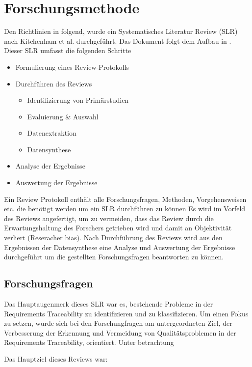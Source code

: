 \section{Forschungsmethode}
Den Richtlinien in \cite{Keele2007GuidelinesEngineering} folgend, wurde ein Systematisches Literatur Review (SLR) nach Kitchenham et al. durchgeführt. Das Dokument folgt dem Aufbau in \cite{Walia2009AErrors}. Dieser SLR umfasst die folgenden Schritte

\begin{itemize}
    \item Formulierung eines Review-Protokolls
    \item Durchführen des Reviews
        \begin{itemize}
            \item Identifizierung von Primärstudien
            \item Evaluierung \& Auswahl
            \item Datenextraktion
            \item Datensynthese
        \end{itemize}
    \item Analyse der Ergebnisse
    \item Auswertung der Ergebnisse
\end{itemize}

Ein Review Protokoll enthält alle Forschungsfragen, Methoden, Vorgehensweisen etc. die benötigt werden um ein SLR durchführen zu können Es wird im Vorfeld des Reviews angefertigt, um zu vermeiden, dass das Review durch die Erwartungshaltung des Forschers getrieben wird und damit an Objektivität verliert (Reseracher bias). Nach Durchführung des Reviews wird aus den Ergebnissen der Datensynthese eine Analyse und Auswertung der Ergebnisse durchgeführt um die gestellten Forschungsfragen beantworten zu können.

\subsection{Forschungsfragen}

Das Hauptaugenmerk dieses SLR war es, bestehende Probleme in der Requirements Traceability zu identifizieren und zu klassifizieren. Um einen Fokus zu setzen, wurde sich bei den Forschungfragen am untergeordneten Ziel, der Verbesserung der Erkennung und Vermeidung von Qualitätsproblemen in der Requirements Traceability, orientiert. Unter betrachtung 

Das Hauptziel dieses Reviews war:

